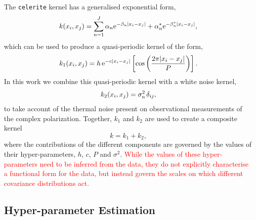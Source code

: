 \documentclass[fleqn,usenatbib]{mnras}
\begin{document}
The {\tt celerite} kernel has a generalised exponential form,
%
\begin{equation}
    k(x_i,x_j) = \sum_{n=1}^{J}{\alpha_n {\rm e}^{-\beta_n |x_i - x_j|} + \alpha_n^{\ast} {\rm e}^{-\beta_n^{\ast} |x_i - x_j|}},
\end{equation}
%
which can be used to produce a quasi-periodic kernel of the form,
%
\begin{equation}
\label{eq:celkernel}
k_1(x_i,x_j)=h\,{\rm e}^{-c|x_i - x_j|}\left[\cos\left(\frac{2\pi|x_i - x_j|}{P}\right)\right].
\end{equation}
%
In this work we combine this quasi-periodic kernel with a white noise kernel,
%
\begin{equation}
\label{eq:whitekernel}
k_2(x_i,x_j)=\sigma_{\rm n}^2\,\delta_{ij},
\end{equation}
%
to take account of the thermal noise present on observational measurements of the complex polarization. Together, $k_1$ and $k_2$ are used to create a composite kernel
%
\begin{equation}
k = k_1 + k_2,
\end{equation}
%
where the contributions of the different components are governed by the values of their hyper-parameters, $h$, $c$, $P$ and $\sigma^2$. \textcolor{red}{While the values of these hyper-parameters need to be inferred from the data, they do not explicitly characterise a functional form for the data, but instead govern the scales on which different covariance distributions act.}

\subsection{Hyper-parameter Estimation}
\label{sec:parms}
\end{document}
